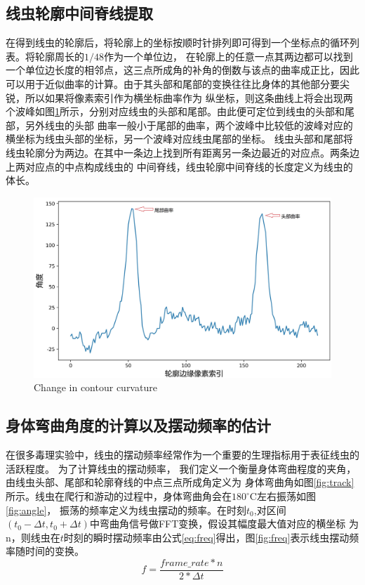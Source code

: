 \subsection{线虫轮廓中间脊线提取}
	在得到线虫的轮廓后，将轮廓上的坐标按顺时针排列即可得到一个坐标点的循环列表。将轮廓周长的$1/48$作为一个单位边，
	在轮廓上的任意一点其两边都可以找到一个单位边长度的相邻点，这三点所成角的补角的倒数与该点的曲率成正比，因此
	可以用于近似曲率的计算。由于其头部和尾部的变换往往比身体的其他部分要尖锐，所以如果将像素索引作为横坐标曲率作为
	纵坐标，则这条曲线上将会出现两个波峰如图\ref{fig:qulv}所示，分别对应线虫的头部和尾部。由此便可定位到线虫的头部和尾部，另外线虫的头部
	曲率一般小于尾部的曲率，两个波峰中比较低的波峰对应的横坐标为线虫头部的坐标，另一个波峰对应线虫尾部的坐标。
	线虫头部和尾部将线虫轮廓分为两边。在其中一条边上找到所有距离另一条边最近的对应点。两条边上两对应点的中点构成线虫的
	中间脊线，线虫轮廓中间脊线的长度定义为线虫的体长。
	\begin{figure}[h]
	  \centering
	  \includegraphics[width=14cm]{figure/chap5/cuvature.jpg}
		{Change in contour curvature}
	  \label{fig:qulv}
	\end{figure}
\subsection{身体弯曲角度的计算以及摆动频率的估计}
	在很多毒理实验中，线虫的摆动频率经常作为一个重要的生理指标用于表征线虫的活跃程度\cite{Wang2008Assessment}。
	为了计算线虫的摆动频率， 我们定义一个衡量身体弯曲程度的夹角，由线虫头部、尾部和轮廓脊线的中点三点所成角定义为
	身体弯曲角如图\ref{fig:track}所示。线虫在爬行和游动的过程中，身体弯曲角会在$180^\circ$C左右振荡如图\ref{fig:angle}，
	振荡的频率定义为线虫摆动的频率。在时刻$t_0$,对区间$(t_0-\Delta t,t_0+\Delta t)$中弯曲角信号做FFT变换，假设其幅度最大值对应的横坐标
	为n，则线虫在$t$时刻的瞬时摆动频率由公式\ref{eq:freq}得出，图\ref{fig:freq}表示线虫摆动频率随时间的变换。
	\begin{equation}
        f=\frac{frame\_rate*n}{2*\Delta t} \label{eq:freq}
	\end{equation}
		
